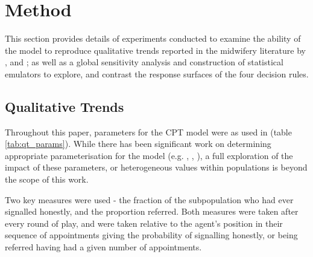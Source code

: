 \section{Method}
\label{sec:method}

This section provides details of experiments conducted to examine the ability of the model to reproduce qualitative trends reported in the midwifery literature by \cite{Alvik2006}, and \cite{Phillips2007}; as well as a global sensitivity analysis and construction of statistical emulators to explore, and contrast the response surfaces of the four decision rules.

\subsection{Qualitative Trends}
\label{sub:qt}


Throughout this paper, parameters for the \ac{CPT} model were as used in \cite{Tversky1992} (table \ref{tab:qt_params}). While there has been significant work on determining appropriate parameterisation for the model (e.g. \cite{Neilson2002}, \cite{Glockner2012}, \cite{Nilsson2011}), a full exploration of the impact of these parameters, or heterogeneous values within populations is beyond the scope of this work.

Two key measures were used - the fraction of the subpopulation who had ever signalled honestly, and the proportion referred. Both measures were taken after every round of play, and were taken relative to the agent's position in their sequence of appointments giving the probability of signalling honestly, or being referred having had a given number of appointments.

